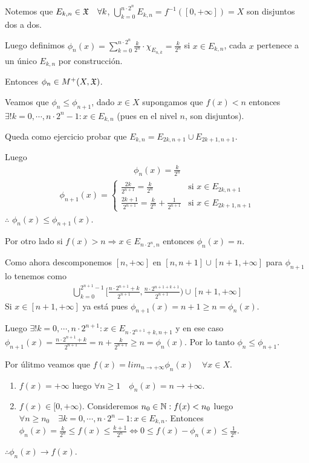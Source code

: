 Notemos que $E_{k, n} \in \mathfrak{X} \quad \forall k$, $\bigcup_{k = 0}^{n \cdot 2^n} E_{k, n} = f^{-1}([0, +\infty]) = X$ son disjuntos dos a dos.

Luego definimos $\phi_n(x) = \sum_{k = 0}^{n \cdot 2^n} \frac{k}{2^n} \cdot \chi_{E_{n, k}} = \frac{k}{2^n}$ si $x \in E_{k, n}$, cada $x$ pertenece a un único $E_{k, n}$ por construcción.

Entonces $\phi_n \in M^+(X ,\mathfrak{X})$.

Veamos que $\phi_n \leq \phi_{n+1}$, dado $x \in X$ supongamos que $f(x) < n$ entonces $\exists! k = 0, \cdots, n \cdot 2^n - 1 : x \in E_{k, n}$ (pues en el nivel $n$, son disjuntos).

Queda como ejercicio probar que $E_{k, n} = E_{2k, n+1} \cup E_{2k+1, n+1}$.

Luego
\begin{align*}
    \phi_n(x) = \frac{k}{2^n}
\end{align*}
\begin{align*}\phi_{n+1}(x) = \begin{cases}
                        \frac{2k}{2^{n+1}} = \frac{k}{2^n}                       & \text{si } x \in E_{2k, n+1}   \\
                        \frac{2k+1}{2^{n+1}} = \frac{k}{2^n} + \frac{1}{2^{n+1}} & \text{si } x \in E_{2k+1, n+1}
                    \end{cases}
\end{align*} $\therefore$ $\phi_n(x) \leq \phi_{n+1}(x)$.

Por otro lado si $f(x) > n \Rightarrow x \in E_{n \cdot 2^n, n}$ entonces $\phi_n(x) = n$.

Como ahora descomponemos $[n, +\infty]$ en $[n, n+1] \cup [n+1, +\infty]$ para $\phi_{n+1}$ lo tenemos como \begin{align*}
    \bigcup_{k = 0}^{2^{n+1}-1} [ \frac{n \cdot 2^{n+1} + k}{2^{n+1}}, \frac{n \cdot 2^{n+1 + k+1}}{2^{n+1}} ) \cup [n+1, +\infty]
\end{align*}
Si $x \in [n+1, +\infty]$ ya está pues $\phi_{n+1}(x) = n+1 \geq n = \phi_n(x)$.

Luego $\exists ! k = 0, \cdots, n \cdot 2^{n+1} : x \in E_{n \cdot 2^{n+1}+k, n+1}$ y en ese caso
$\phi_{n+1}(x) = \frac{n \cdot 2^{n+1} + k}{2^{n+1}} = n + \frac{k}{2^{n+1}} \geq n = \phi_n(x)$.
Por lo tanto $\phi_n \leq \phi_{n+1}$.

Por úlitmo veamos que $f(x) = lim_{n \to +\infty} \phi_n(x) \quad \forall x \in X$.
\begin{enumerate}
    \item $f(x) = +\infty$ luego $\forall n \geq 1 \quad \phi_n(x) = n \to +\infty$.
    \item $f(x) \in [0, +\infty)$. Consideremos $n_0 \in \mathbb{N} : f(x) < n_0$ luego $\forall n \geq n_0 \quad \exists k = 0, \cdots, n \cdot 2^n - 1 : x \in E_{k, n}$.
          Entonces $\phi_n(x) = \frac{k}{2^n} \leq f(x) \leq \frac{k+1}{2^n} \iff 0 \leq f(x) - \phi_n(x) \leq \frac{1}{2^n}$.
\end{enumerate}
$\therefore \phi_n(x) \to f(x)$.

